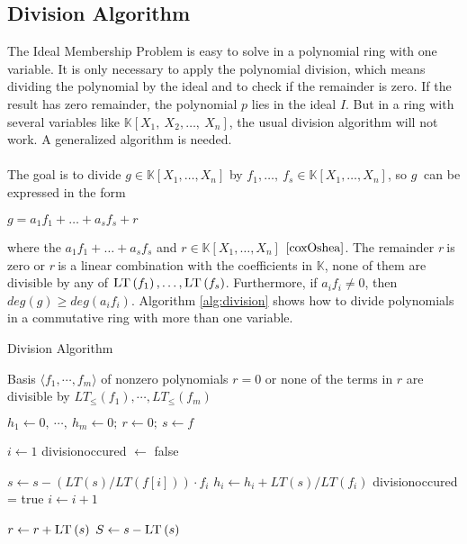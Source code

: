 \newpage


\subsection{Division Algorithm}
\label{subsec:division}

The Ideal Membership Problem is easy to solve in a polynomial ring with one variable. It is only necessary to apply the polynomial division, which means dividing the polynomial by the ideal and to check if the remainder is zero. 
If the result has zero remainder, the polynomial $p$ lies in the ideal $I$.
But in a ring with several variables like $ \mathbb{K} \left[X_{1},~X_{2},\dots,~X_{n}\right]$, the usual division algorithm will not work. A generalized algorithm is needed.\\ \\
The goal is to divide $g \in \mathbb{K}\left[X_{1}, \dots, X_{n}\right] $ by 
$f_{1},\dots,~ f_{s} \in \mathbb{K}\left[X_{1}, \dots, X_{n}\right]$, so $g~$ can be expressed in the form \begin{center}
$g = a_{1}f_{1}+ \ldots + a_{s}f_{s} +r$
\end{center} 
where the $a_{1}f_{1}+ \ldots + a_{s}f_{s} $ and $r \in \mathbb{K}\left[X_{1}, \dots, X_{n}\right]$ $\cite{coxOshea}$.
The remainder $r~$is zero or $r~$is a linear combination with the coefficients in $\mathbb{K}$, none of them are divisible by any of
$\textsc{LT}\left(f_{1} \right), \ldots, \textsc{LT}\left(f_{s} \right)  $.
Furthermore, if $a_{i}f_{i} \neq 0 $, then
$deg(g) \geq deg(a_{i}f_{i})$. Algorithm \ref{alg:division} shows how to divide polynomials in a commutative ring with more than one variable.

\newpage


\begin{algorithm}
\caption{Division Algorithm \cite{KHZ}}
\label{alg:division}
\begin{algorithmic}[1]

\Require Basis $\langle f_{1}, \cdots, f_{m}\rangle$ of nonzero polynomials  
\Ensure $r=0$ or none of the terms in $r$ are divisible by $ LT_{\leq}\left( f_{1}\right) , \cdots , LT_{\leq} \left( f_{m}\right) $

\State $ h_{1} \gets 0 ,~\cdots ,~h_{m} \gets 0;~r \gets 0;~s \gets f  $

\State $ i \gets 1 $
\State  division\textunderscore occured $ \gets $  false 

\State $ s \gets s - ( LT \left( s\right)/ LT \left( f \left[ i\right] \right))  \cdot f_{i} $
\State $h_{i} \gets h_{i} + LT\left( s\right) / LT\left( f_{i}\right) $
\State division\textunderscore occured = true
\Else
\State $i \gets i+1$
\EndIf
\EndWhile

\State $ r \gets r + \textsc{LT}\left( s\right) $
\State $ S \gets s - \textsc{LT}\left( s\right) $
\EndIf

\EndWhile


\end{algorithmic}
\end{algorithm}


